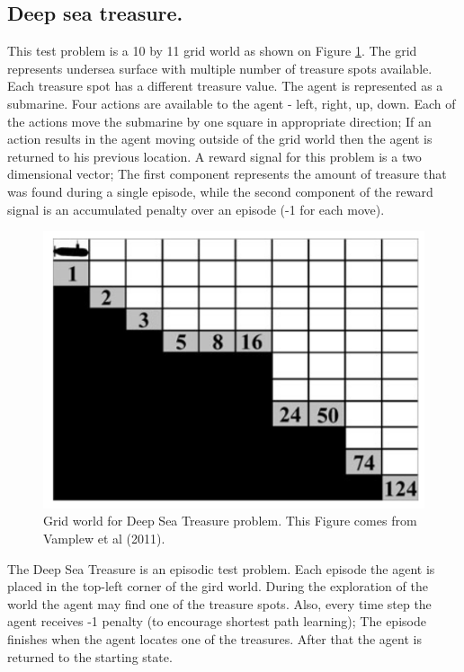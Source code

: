 {{\subsection{Deep sea treasure.}
This test problem is a 10 by 11 grid world as shown on Figure \ref{fig:DSTOverview}. The grid represents undersea surface with multiple number of treasure spots available. Each treasure spot has a different treasure value. The agent is represented as a submarine. Four actions are available to the agent - left, right, up, down. Each of the actions move the submarine by one square in appropriate direction; If an action results in the agent moving outside of the grid world then the agent is returned to his previous location. A reward signal for this problem is a two dimensional vector; The first component represents the amount of treasure that was found during a single episode, while the second component of the reward signal is an accumulated penalty over an episode (-1 for each move).

\begin{figure}[ht]
\vskip 0.2in
\centering
\includegraphics[scale=0.9]{dst.png}
\caption{Grid world for Deep Sea Treasure problem. This Figure comes from Vamplew et al (2011).}
\label{fig:DSTOverview}
\end{figure}

The Deep Sea Treasure is an episodic test problem. Each episode the agent is placed in the top-left corner of the gird world. During the exploration of the world the agent may find one of the treasure spots. Also, every time step the agent receives -1 penalty (to encourage shortest path learning); The episode finishes when the agent locates one of the treasures. After that the agent is returned to the starting state.

}}
